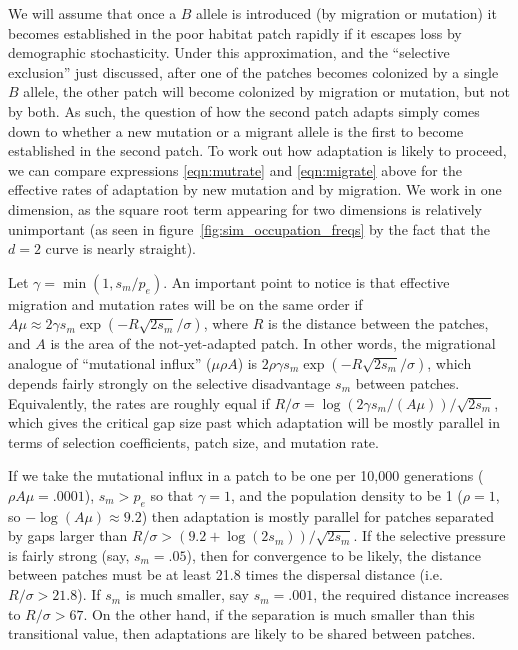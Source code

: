 \documentclass{article}
\begin{document}
We will assume that once a $B$ allele is introduced (by migration or mutation) 
it becomes established in the poor habitat patch rapidly
if it escapes loss by demographic stochasticity.
Under this approximation, and the ``selective exclusion'' just discussed,
after one of the patches becomes colonized by a single $B$ allele, 
the other patch will become colonized by migration or mutation, but not by both. 
As such, the question of how the second patch adapts
simply comes down to whether a new mutation or a migrant allele is the first to become established in the second patch. 
To work out how adaptation is likely to proceed, 
we can compare expressions \eqref{eqn:mutrate} and \eqref{eqn:migrate} above
for the effective rates of adaptation by new mutation and by migration.
We work in one dimension, as the square root term appearing for two dimensions is relatively unimportant 
(as seen in figure~\ref{fig:sim_occupation_freqs} by the fact that the $d=2$ curve is nearly straight).

Let $\gamma = \min(1,s_m/p_e)$.
An important point to notice is that effective migration and mutation rates will be on the same order if 
$A \mu \approx 2 \gamma s_m \exp(- R \sqrt{2 s_m} / \sigma)$,
where $R$ is the distance between the patches,
and $A$ is the area of the not-yet-adapted patch.
In other words, the migrational analogue of ``mutational influx'' ($\mu \rho A$) 
is $2 \rho \gamma s_m \exp(- R \sqrt{2 s_m} / \sigma)$,
which depends fairly strongly on the selective disadvantage $s_m$ between patches.
Equivalently, the rates are roughly equal if
$R/\sigma = \log(2 \gamma s_m/(A \mu))/\sqrt{2s_m}$,
which gives the critical gap size past which adaptation will be mostly parallel
in terms of selection coefficients, patch size, and mutation rate.


If we take the mutational influx in a patch to be one per 10,000 generations ($\rho A \mu = .0001$),
$s_m>p_e$ so that $\gamma=1$,
and the population density to be 1 ($\rho =1$, so $-\log(A\mu)\approx 9.2$)
then adaptation is mostly parallel for patches separated by gaps larger than $R/\sigma > (9.2+\log(2s_m))/\sqrt{2s_m}$.
If the selective pressure is fairly strong (say, $s_m=.05$),
then for convergence to be likely,
the distance between patches must be at least 21.8 times the dispersal distance (i.e.\ $R/\sigma > 21.8$).
If $s_m$ is much smaller, say $s_m = .001$, 
the required distance increases to $R/\sigma > 67$.
On the other hand, if the separation is much smaller than this transitional value, 
then adaptations are likely to be shared between patches.
\end{document}
